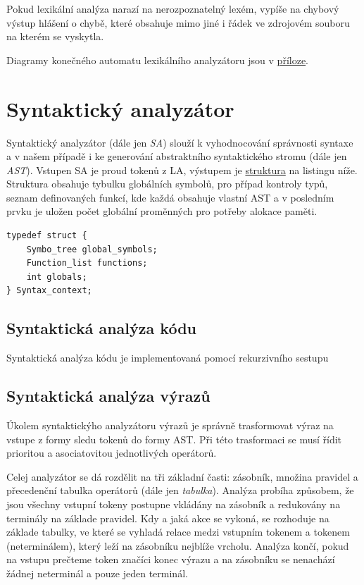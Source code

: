 \documentclass[a4paper,11pt]{article}
\begin{document}
Pokud lexikální analýza narazí na nerozpoznatelný lexém, vypíše na chybový výstup hlášení o chybě, které obsahuje mimo jiné i řádek ve zdrojovém souboru na kterém se vyskytla.

Diagramy konečného automatu lexikálního analyzátoru jsou v \hyperref[diag:LA-FSM]{příloze}.


\section{Syntaktický analyzátor}
Syntaktický analyzátor (dále jen \textit{SA}) slouží k vyhodnocování správnosti syntaxe a v našem případě i ke generování abstraktního syntaktického stromu (dále jen \textit{AST}). Vstupen SA je proud tokenů z LA, výstupem je \hyperref[lst:saOut]{struktura} na listingu níže. Struktura obsahuje tybulku globálních symbolů, pro případ kontroly typů, seznam definovaných funkcí, kde každá obsahuje vlastní AST a v posledním prvku je uložen počet globální proměnných pro potřeby alokace paměti.

\begin{lstlisting}[caption={Výstupní struktura SA}, label={lst:saOut}]
typedef struct {
	Symbo_tree global_symbols;
	Function_list functions;
	int globals;
} Syntax_context;
\end{lstlisting}

\subsection{Syntaktická analýza kódu}
Syntaktická analýza kódu je implementovaná pomocí rekurzivního sestupu

\subsection{Syntaktická analýza výrazů}
Úkolem syntaktickýho analyzátoru výrazů je správně trasformovat výraz na vstupe z formy sledu tokenů do formy AST. Při této trasformaci se musí řídit prioritou a asociatovitou jednotlivých operátorů.

Celej analyzátor se dá rozdělit na tři základní časti: zásobník, množina pravidel a přecedenční tabulka operátorů (dále jen \textit{tabulka}). Analýza probíha způsobem, že jsou všechny vstupní tokeny postupne vkládány na zásobník a redukovány na terminály na základe pravidel. Kdy a jaká akce se vykoná, se rozhoduje na základe tabulky, ve které se vyhladá relace medzi vstupním tokenem a tokenem (neterminálem), který leží na zásobníku nejblíže vrcholu. Analýza končí, pokud na vstupu prečteme token značíci konec výrazu a na zásobníku se nenachází žádnej neterminál a pouze jeden terminál.
\end{document}

